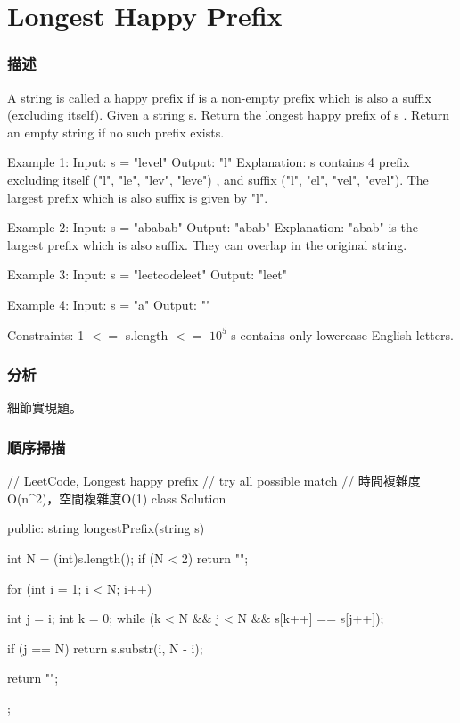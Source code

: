 \section{Longest Happy Prefix} %
\label{sec:longest-happy-prefix}


\subsubsection{描述}
A string is called a happy prefix if is a non-empty prefix which is also a suffix (excluding itself).
Given a string s. Return the longest happy prefix of s .
Return an empty string if no such prefix exists.

\begin{Code}
Example 1:
Input: s = "level"
Output: "l"
Explanation: s contains 4 prefix excluding itself ("l", "le", "lev", "leve")
, and suffix ("l", "el", "vel", "evel").
The largest prefix which is also suffix is given by "l".

Example 2:
Input: s = "ababab"
Output: "abab"
Explanation: "abab" is the largest prefix which is also suffix.
They can overlap in the original string.

Example 3:
Input: s = "leetcodeleet"
Output: "leet"

Example 4:
Input: s = "a"
Output: ""
\end{Code}

Constraints:
1 $<=$ s.length $<=$ $10^5$
s contains only lowercase English letters.

\subsubsection{分析}
細節實現題。


\subsubsection{順序掃描}
\begin{Code}
// LeetCode, Longest happy prefix
// try all possible match
// 時間複雜度O(n^2)，空間複雜度O(1)
class Solution {
public:
    string longestPrefix(string s) {
        int N = (int)s.length();
        if (N < 2) return "";

        for (int i = 1; i < N; i++) {
            int j = i;
            int k = 0;
            while (k < N && j < N && s[k++] == s[j++]);

            if (j == N) return s.substr(i, N - i);
        }

        return "";
    }
};
\end{Code}

